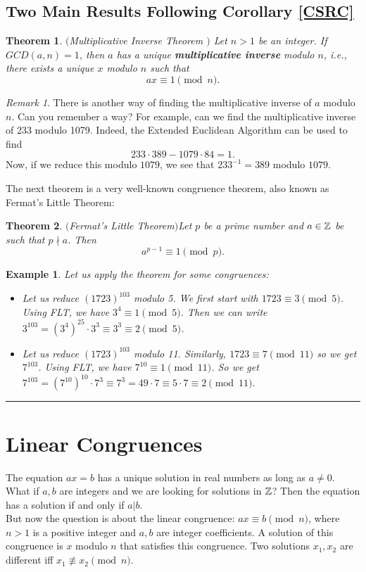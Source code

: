\documentclass[12pt]{article}
\theoremstyle{plain}
\newtheorem{example}{Example}
\newtheorem{theorem}{Theorem}
\theoremstyle{definition}
\theoremstyle{remark}
\newtheorem{remark}{Remark}
\begin{document}
\subsection{Two Main Results Following Corollary \ref{CSRC}}
\begin{theorem}$($Multiplicative Inverse Theorem $)$ \label{MultInv}
Let $n>1$ be an integer. If $GCD(a,n)=1$, then $a$ has a {\it unique} {\bf multiplicative inverse} modulo $n$, i.e., there exists a unique $x$ modulo $n$ such that
$$ax \equiv 1 \pmod{n}.$$
\end{theorem}

\bigskip
\begin{remark}
There is another way of finding the multiplicative inverse of $a$ modulo $n$. Can you remember a way? For example, can we find the multiplicative inverse of 233 modulo 1079. Indeed, the Extended Euclidean Algorithm can be used to find
$$233\cdot 389-1079\cdot 84=1.$$
Now, if we reduce this modulo $1079$, we see that $233^{-1}=389$ modulo $1079$.
\end{remark}

\bigskip
\noindent
The next theorem is a very well-known congruence theorem, also known as Fermat's Little Theorem:
\begin{theorem}$($Fermat's Little Theorem$)$\label{FLiT}
Let $p$ be a prime number and $a\in \mathbb{Z}$ be such that $p\nmid a$. Then $$a^{p-1}\equiv 1 \pmod{p}.$$
\end{theorem}
 \bigskip
 \begin{example}
 Let us apply the theorem for some congruences:
 \begin{itemize}
     \item Let us reduce $(1723)^{103}$ modulo 5.
We first start with $1723\equiv 3\pmod{5}$. Using FLT, we have $3^4\equiv 1\pmod{5}$. Then we can write $3^{103}=(3^4)^{25}\cdot 3^3 \equiv 3^3\equiv 2\pmod{5}$.
     \item Let us reduce $(1723)^{103}$ modulo 11. Similarly, $1723\equiv 7 \pmod{11}$ so we get $7^{103}$. Using FLT, we have $7^{10}\equiv 1 \pmod{11}$. So we get $7^{103} = (7^{10})^{10}\cdot 7^3 \equiv 7^3 = 49\cdot 7 \equiv 5\cdot 7 \equiv 2\pmod{11}.$
      \end{itemize}
 \end{example}

\bigskip
\hrule
\section{Linear Congruences}
The equation $ax=b$ has a unique solution in real numbers as long as $a\neq 0$.\\
What if $a,b$ are integers and we are looking for solutions in $\mathbb{Z}$?
Then the equation has a solution if and only if $a|b$. \\
But now the question is about the linear congruence: $ax\equiv b \pmod{n}$, where $n>1$ is a positive integer and $a, b$ are integer coefficients. A solution of this congruence is $x$ modulo $n$ that satisfies this congruence. Two solutions $x_1, x_2$ are different iff $x_1\not \equiv x_2 \pmod{n}$.
\end{document}
